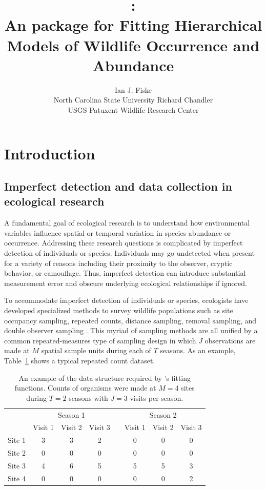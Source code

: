 \documentclass[article,shortnames]{jss}
\author{Ian J. Fiske\\North Carolina State University \And
  Richard Chandler\\ USGS Patuxent Wildlife Research Center}
\title{\pkg{unmarked}:\\
  An \proglang{R} package for Fitting Hierarchical Models of 
  Wildlife Occurrence and Abundance}
\newcommand{\um}{\pkg{unmarked}}
\begin{document}
\section{Introduction}


\subsection{Imperfect detection and data collection in ecological research}

A fundamental goal of ecological research is to understand how environmental 
variables influence spatial or temporal variation in species abundance or 
occurrence.  Addressing these research questions is complicated by imperfect 
detection of individuals or species.  Individuals may go 
undetected when present for a variety of reasons including their proximity to 
the observer, cryptic behavior, or camouflage. Thus, imperfect detection 
can introduce substantial measurement error and obscure underlying 
ecological relationships if ignored. 

To accommodate imperfect detection of individuals or species, 
ecologists have developed specialized methods to survey wildlife 
populations such as site occupancy sampling, repeated counts, 
distance sampling, removal sampling, and double observer sampling 
\citetext{see Section~\ref{sec:models-impl-unmark} and 
\citep{WilliamsEA2002} for definitions}.  This myriad of sampling methods 
are all unified by a common repeated-measures type of sampling design in 
which $J$ observations are made at $M$ spatial sample units during each of 
$T$ seasons. As an example, Table~\ref{tab:exdata} shows a typical 
repeated count dataset. 

\begin{table}[h] %
\begin{centering}
\begin{tabular}{lccccccc}
\hline
& \multicolumn{3}{c}{Season 1} && \multicolumn{3}{c}{Season 2} \\
\cline{2-4} \cline{6-8} 
        & Visit 1 & Visit 2 & Visit 3 && Visit 1 & Visit 2 & Visit 3 \\
\hline
Site 1  & 3       & 3       & 2       && 0       & 0       & 0 \\
Site 2  & 0       & 0       & 0       && 0       & 0       & 0 \\
Site 3  & 4       & 6       & 5       && 5       & 5       & 3 \\
Site 4  & 0       & 0       & 0       && 0       & 0       & 2 \\  
\hline
\end{tabular}
\caption{An example of the data structure required by \um's fitting functions. 
Counts of organisms were made at $M=4$ sites during $T=2$ seasons with $J=3$ 
visits per season.}
\end{centering}
\label{tab:exdata}
\end{table}
\end{document}
